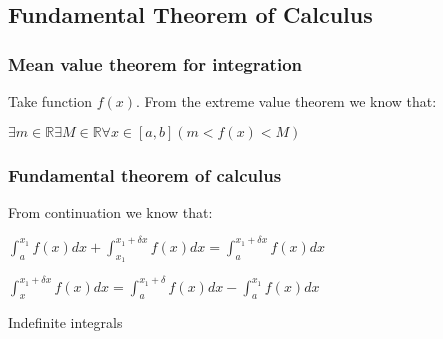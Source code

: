 
\subsection{Fundamental Theorem of Calculus}

\subsubsection{Mean value theorem for integration}

Take function \(f(x)\). From the extreme value theorem we know that:

\(\exists m \in \mathbb{R} \exists M\in \mathbb{R}\forall x\in [a,b](m<f(x)<M)\)

\subsubsection{Fundamental theorem of calculus}

From continuation we know that:

\(\int_a^{x_1}f(x)dx+\int_{x_1}^{x_1+\delta x}f(x)dx=\int_a^{x_1+\delta x}f(x)dx\)

\(\int_x^{x_1+\delta x}f(x)dx=\int_a^{x_1+\delta }f(x)dx-\int_a^{x_1 }f(x)dx\)

Indefinite integrals

